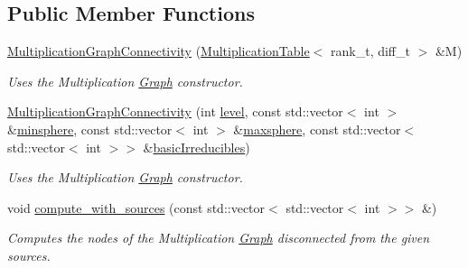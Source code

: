 \subsection*{Public Member Functions}
\begin{DoxyCompactItemize}
\item 
\hyperlink{classMackey_1_1MultiplicationGraphConnectivity_aef4ccbe9bb70020fc9ed264964fbda7d}{Multiplication\+Graph\+Connectivity} (\hyperlink{classMackey_1_1MultiplicationTable}{Multiplication\+Table}$<$ rank\+\_\+t, diff\+\_\+t $>$ \&M)
\begin{DoxyCompactList}\small\item\em Uses the Multiplication \hyperlink{classMackey_1_1Graph}{Graph} constructor. \end{DoxyCompactList}\item 
\hyperlink{classMackey_1_1MultiplicationGraphConnectivity_a7e902dcb12c7731f335b38d65a5d9ab3}{Multiplication\+Graph\+Connectivity} (int \hyperlink{classMackey_1_1MultiplicationTable_ad5a05c126e0b3c769fa9b1196a8db96a}{level}, const std\+::vector$<$ int $>$ \&\hyperlink{classMackey_1_1MultiplicationTable_a071f7d7c6cd1c75836b64ea8e9923b49}{minsphere}, const std\+::vector$<$ int $>$ \&\hyperlink{classMackey_1_1MultiplicationTable_a4355003c6be4a4f857eba151c8e5bcf6}{maxsphere}, const std\+::vector$<$ std\+::vector$<$ int $>$$>$ \&\hyperlink{classMackey_1_1MultiplicationTable_af6896ea01c087e71533de423d7cf65ac}{basic\+Irreducibles})
\begin{DoxyCompactList}\small\item\em Uses the Multiplication \hyperlink{classMackey_1_1Graph}{Graph} constructor. \end{DoxyCompactList}\item 
void \hyperlink{classMackey_1_1MultiplicationGraphConnectivity_a81e8f3efb867ea951573a2a5ca5825ed}{compute\+\_\+with\+\_\+sources} (const std\+::vector$<$ std\+::vector$<$ int $>$$>$ \&)
\begin{DoxyCompactList}\small\item\em Computes the nodes of the Multiplication \hyperlink{classMackey_1_1Graph}{Graph} disconnected from the given sources. \end{DoxyCompactList}\end{DoxyCompactItemize}
